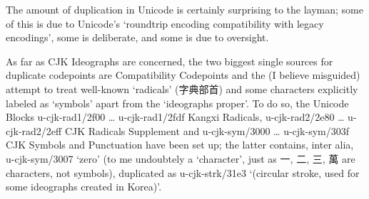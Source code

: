 \begin{multicols}{2}
\endgroup{}The amount of duplication in Unicode is certainly surprising to the
layman; some of this is due to Unicode’s ‘roundtrip encoding compatibility
with legacy encodings’, some is deliberate, and some is due to oversight.\mktsShowpar\par
As far as CJK Ideographs are concerned, the two biggest single sources
for duplicate codepoints are Compatibility Codepoints and the (I believe
misguided) attempt to treat well-known ‘radicals’ ({\cjk{}字典部首}) and some characters
explicitly labeled as ‘symbols’ apart from the ‘ideographs proper’. To do
so, the Unicode Blocks
u-cjk-rad1/2f00 … u-cjk-rad1/2fdf {\mktsStyleItalic{}Kangxi Radicals},
u-cjk-rad2/2e80 … u-cjk-rad2/2eff {\mktsStyleItalic{}CJK Radicals Supplement} and
u-cjk-sym/3000 … u-cjk-sym/303f 	{\mktsStyleItalic{}CJK Symbols and Punctuation}
have been set up; the latter contains, inter alia,
u-cjk-sym/3007 {\cjk{}} ‘zero’ (to me undoubtely a ‘character’, just as
{\cjk{}一}, {\cjk{}二}, {\cjk{}三}, {\cjk{}萬} are characters, not symbols), duplicated as
u-cjk-strk/31e3 { }‘(circular stroke, used for some ideographs created
in Korea)’.\mktsShowpar\par
\begingroup\mktsObeyAllLines{}


\end{multicols}
